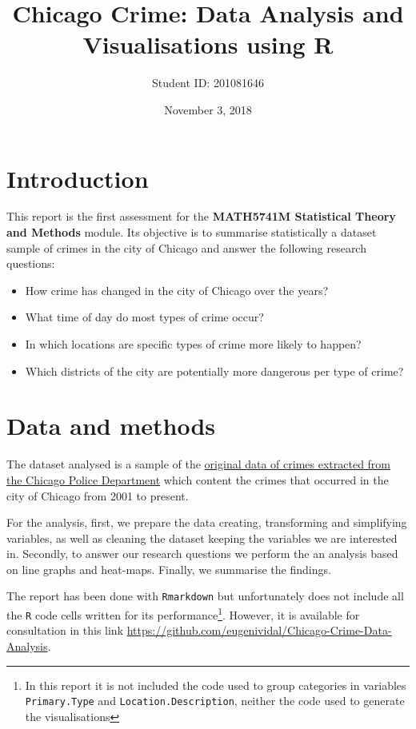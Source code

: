 \documentclass[]{article}
\title{Chicago Crime: Data Analysis and Visualisations using R}
\author{Student ID: 201081646}
\date{November 3, 2018}
\let\rmarkdownfootnote\footnote%
\def\footnote{\protect\rmarkdownfootnote}
\begin{document}
\maketitle

\section{Introduction}\label{introduction}

This report is the first assessment for the \textbf{MATH5741M
Statistical Theory and Methods} module. Its objective is to summarise
statistically a dataset sample of crimes in the city of Chicago and
answer the following research questions:

\begin{itemize}
\item
  How crime has changed in the city of Chicago over the years?
\item
  What time of day do most types of crime occur?
\item
  In which locations are specific types of crime more likely to happen?
\item
  Which districts of the city are potentially more dangerous per type of
  crime?
\end{itemize}

\section{Data and methods}\label{data-and-methods}

The dataset analysed is a sample of the
\href{https://data.cityofchicago.org/Public-Safety/Crimes-2001-to-present/ijzp-q8t2}{original
data of crimes extracted from the Chicago Police Department} which
content the crimes that occurred in the city of Chicago from 2001 to
present.

For the analysis, first, we prepare the data creating, transforming and
simplifying variables, as well as cleaning the dataset keeping the
variables we are interested in. Secondly, to answer our research
questions we perform the an analysis based on line graphs and heat-maps.
Finally, we summarise the findings.

The report has been done with \texttt{Rmarkdown} but unfortunately does
not include all the \texttt{R} code cells written for its
performance\footnote{In this report it is not included the code used to
  group categories in variables \texttt{Primary.Type} and
  \texttt{Location.Description}, neither the code used to generate the
  visualisations}. However, it is available for consultation in this
link \url{https://github.com/eugenividal/Chicago-Crime-Data-Analysis}.
\end{document}
